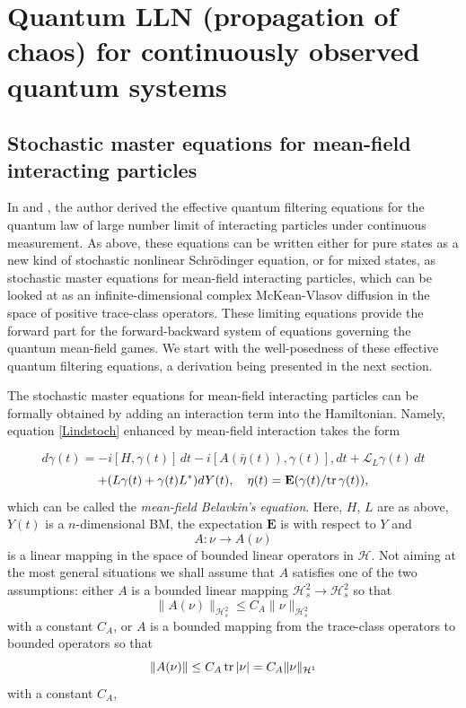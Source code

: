 \documentclass[12pt]{article}
\def\LC{\mathcal{L}}
\def\HC{\mathcal{H}}
\def\E{\mathbf{E}}
\def\tr{\rm{tr}}
\def\ga{\gamma}
\begin{document}
\section{Quantum LLN (propagation of chaos) for continuously observed quantum systems}
\label{secLLN}

\subsection{Stochastic master equations for mean-field interacting particles}
\label{secMFeq}

In \cite{KolQuantLLN} and \cite{KolQuantMFG}, the author derived the
effective quantum filtering equations for the quantum law of large number limit of interacting particles
under continuous measurement. As above, these equations can be written either for pure states
as a new kind of stochastic nonlinear Schr\"odinger equation, or for mixed states, as stochastic master equations for
 mean-field interacting particles, which can be looked at as an infinite-dimensional complex McKean-Vlasov
 diffusion in the space of positive trace-class operators. These limiting equations provide the forward
 part for the forward-backward system of equations governing the quantum mean-field games.
 We start with the well-posedness of these effective quantum filtering equations,
 a derivation being presented in the next section.

 The stochastic master equations for mean-field interacting particles
 can be formally obtained by adding an interaction term into the Hamiltonian.
 Namely, equation \eqref{Lindstoch} enhanced by mean-field interaction takes the form

 \[
d\ga(t)=-i[H,\ga(t)] \, dt -i[A(\bar \eta(t)), \ga(t)] , dt +\LC_L \ga(t) \, dt
\]
 \begin{equation}
\label{LindstochnewBel}
+(L\ga(t)+\ga(t) L^*) dY(t), \quad \eta(t) =\E (\ga(t)/{\tr}\, \ga (t)),
\end{equation}
which can be called the {\it mean-field Belavkin's equation}.
Here, $H$, $L$ are as above, $Y(t)$ is a $n$-dimensional BM,
the expectation $\E$ is with respect to $Y$ and
\[
A: \nu \to A(\nu)
\]
is a linear mapping in the space of bounded linear operators in $\HC$.
Not aiming at the most general situations
we shall assume that $A$ satisfies one of the two assumptions:
either $A$ is a
bounded linear mapping $\HC_s^2 \to \HC_s^2$ so that
\begin{equation}
\label{eqinterterm}
\|A(\nu)\|_{\HC^2_s} \le C_A \|\nu\|_{\HC^2_s}
\end{equation}
with a constant $C_A$, or $A$ is a bounded mapping from the trace-class operators to bounded
operators so that
\begin{equation}
\label{eqinterterm1}
\|A(\nu)\| \le C_A \, {\tr}\, |\nu| =C_A\|\nu\|_{\HC^1}
\end{equation}
with a constant $C_A$,
\end{document}
